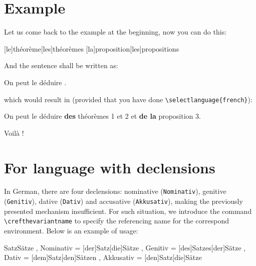 \documentclass[classical]{einfart}
\newenvironment{demo}
  {%
    \LocallyStopLineNumbers%
    \begin{tcolorbox}[enhanced jigsaw,pad at break*=1mm,breakable,
        left=2.5mm,right=3mm,top=0.5mm,bottom=0mm,
        colback=gray!5!paper,boxrule=0pt,frame hidden,
        borderline west={1.2mm}{0mm}{gray!55!paper},arc=.7mm]%
  }
  {%
    \end{tcolorbox}%
    \ResumeLineNumbers%
  }
\begin{document}



\section{Example}

Let us come back to the example at the beginning, now you can do this:

\begin{code}
[le]{théorème}[les]{théorèmes}
[la]{proposition}[les]{propositions}
\end{code}

And the sentence shall be written as:

\begin{code}
On peut le déduire .
\end{code}

which would result in (provided that you have done \lstinline|\selectlanguage{french}|):

\begin{demo}
    On peut le déduire \textbf{des} théorèmes 1 et 2 et \textbf{de la} proposition 3.
\end{demo}

Voilà !

\section{For language with declensions}

In German, there are four declensions: nominative (\texttt{Nominativ}), genitive (\texttt{Genitiv}), dative (\texttt{Dativ}) and accusative (\texttt{Akkusativ}), making the previously presented mechanism insufficient. For such situation, we introduce the command \lstinline|\crefthevariantname| to specify the referencing name for the correspond environment. Below is an example of usage:

\begin{code}
  {
    {Satz}{Sätze}
    , Nominativ = [der]{Satz}[die]{Sätze}
    , Genitiv   = [des]{Satzes}[der]{Sätze}
    , Dativ     = [dem]{Satz}[den]{Sätzen}
    , Akkusativ = [den]{Satz}[die]{Sätze}
  }
\end{code}
\end{document}
